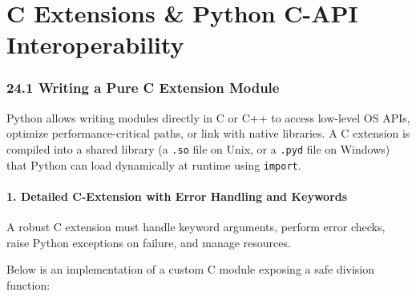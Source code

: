 \hypertarget{c-extensions-python-c-api-interoperability}{%
\chapter{C Extensions \& Python C-API
Interoperability}\label{c-extensions-python-c-api-interoperability}}

\hypertarget{writing-a-pure-c-extension-module}{%
\subsection{24.1 Writing a Pure C Extension
Module}\label{writing-a-pure-c-extension-module}}

Python allows writing modules directly in C or C++ to access low-level
OS APIs, optimize performance-critical paths, or link with native
libraries. A C extension is compiled into a shared library (a
\passthrough{\lstinline!.so!} file on Unix, or a
\passthrough{\lstinline!.pyd!} file on Windows) that Python can load
dynamically at runtime using \passthrough{\lstinline!import!}.

\hypertarget{detailed-c-extension-with-error-handling-and-keywords}{%
\subsubsection{1. Detailed C-Extension with Error Handling and
Keywords}\label{detailed-c-extension-with-error-handling-and-keywords}}

A robust C extension must handle keyword arguments, perform error
checks, raise Python exceptions on failure, and manage resources.

Below is an implementation of a custom C module exposing a safe division
function:

